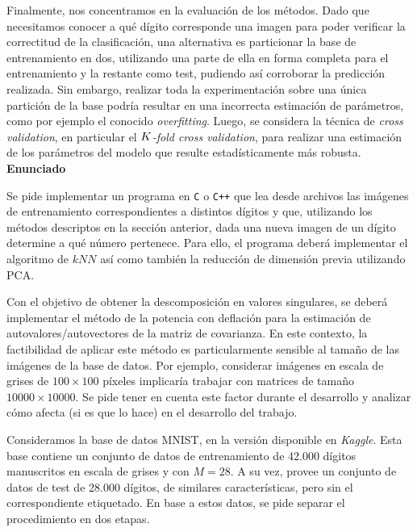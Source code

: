 Finalmente, nos concentramos en la evaluaci\'on de los m\'etodos. Dado que necesitamos conocer a qu\'e d\'igito corresponde una imagen para poder verificar la correctitud de la clasificaci\'on, una alternativa es particionar la base de entrenamiento en dos, utilizando una parte de ella en forma completa para el entrenamiento y la restante como test, pudiendo as\'i corroborar la predicci\'on realizada. Sin embargo, realizar toda la experimentaci\'on sobre una \'unica partici\'on de la base podr\'ia resultar en una incorrecta estimaci\'on de par\'ametros, como por ejemplo el conocido \emph{overfitting}. Luego, se considera la t\'ecnica de \emph{cross validation}, en particular el \emph{$K$-fold cross validation}, para realizar una estimaci\'on de los par\'ametros del modelo que resulte estad\'isticamente m\'as robusta.\\ 

{\bf\noindent Enunciado}

Se pide implementar un programa en \verb+C+ o \verb-C++- que lea desde archivos las im\'agenes de entrenamiento correspondientes a distintos d\'igitos y que, utilizando los m\'etodos descriptos en la secci\'on anterior, dada una nueva imagen de un d\'igito determine a qu\'e n\'umero pertenece. Para ello, el programa deber\'a implementar el algoritmo de $kNN$ as\'i como tambi\'en la reducci\'on de dimensi\'on previa utilizando PCA.  

Con el objetivo de obtener la descomposici\'on en valores singulares, se deber\'a implementar el m\'etodo de la potencia con deflaci\'on para la estimaci\'on de autovalores/autovectores de la matriz de covarianza. En este contexto, la factibilidad de aplicar este m\'etodo es particularmente sensible al tama\~no de las im\'agenes de la base de datos. Por ejemplo, considerar im\'agenes en escala de grises de $100 \times 100$ p\'ixeles implicar\'ia trabajar con matrices de tama\~no $10000 \times 10000$. Se pide tener en cuenta este factor durante el desarrollo y analizar c\'omo afecta (si es que lo hace) en el desarrollo del trabajo. 

Consideramos la base de datos MNIST, en la versi\'on disponible en \emph{Kaggle}. Esta base contiene un conjunto de datos de entrenamiento de 42.000 d\'igitos manuscritos en escala de grises y con $M = 28$. A su vez, provee un conjunto de datos de test de 28.000 d\'igitos, de similares caracter\'isticas, pero sin el correspondiente etiquetado. En base a estos datos, se pide separar el procedimiento en dos etapas. 

